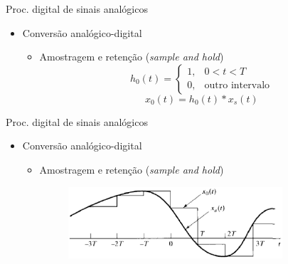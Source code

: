 \begin{slide}{Proc. digital de sinais anal\'ogicos}
\begin{itemize}
   \item Conversão analógico-digital
   \begin{itemize}
      \item Amostragem e retenção (\emph{sample and hold})
      \begin{equation}
          h_0(t) = \begin{cases} 1, & 0<t<T\\0, & \text{outro intervalo}\end{cases}
      \end{equation}
      \begin{equation}
          x_0(t) = h_0(t)\ast x_s(t)
      \end{equation}
   \end{itemize}
\end{itemize}
\end{slide}

\begin{slide}{Proc. digital de sinais anal\'ogicos}
\begin{itemize}
   \item Conversão analógico-digital
   \begin{itemize}
      \item Amostragem e retenção (\emph{sample and hold})
      \begin{figure}
        \centering
         \includegraphics[width = 0.8\textwidth]{figs/ad_conv3.eps}
      \end{figure}

   \end{itemize}
\end{itemize}
\end{slide}

